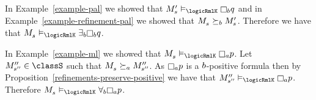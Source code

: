\begin{example}
In Example~\ref{example-pal} we showed that $\kPModelP{\kStateS} \entails_\logicRmlK \knowsB \atomQ$ and in Example~\ref{example-refinement-pal} we showed that $\kPModel{\kStateS} \simulatesB \kPModelP{\kStateS}$.
Therefore we have that $\kPModel{\kStateS} \entails_\logicRmlK \somerefsB \knowsB \atomQ$.

In Example~\ref{example-ml} we showed that $\kPModel{\kStateS} \entails_\logicRmlK \knowsA \atomP$.
Let $\kPModelPP{\kStateSPP} \in \classS$ such that $\kPModel{\kStateS} \simulatesA \kPModelPP{\kStateSPP}$.
As $\knowsA \atomP$ is a $b$-positive formula then by Proposition~\ref{refinements-preserve-positive} we have that $\kPModelPP{\kStateSPP} \entails_\logicRmlK \knowsA \atomP$.
Therefore $\kPModel{\kStateS} \entails_\logicRmlK \allrefsB \knowsA \atomP$.
\end{example}

